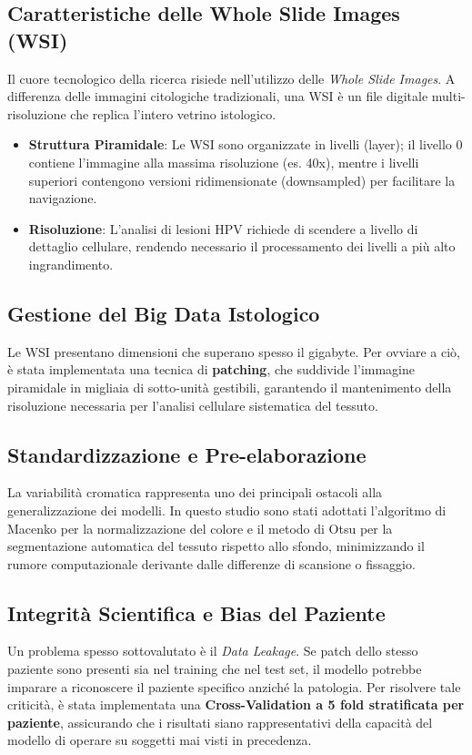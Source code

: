 \subsection{Caratteristiche delle Whole Slide Images (WSI)}
Il cuore tecnologico della ricerca risiede nell'utilizzo delle \textit{Whole Slide Images}. A differenza delle immagini citologiche tradizionali, una WSI è un file digitale multi-risoluzione che replica l'intero vetrino istologico. 
\begin{itemize}
	\item \textbf{Struttura Piramidale}: Le WSI sono organizzate in livelli (layer); il livello 0 contiene l'immagine alla massima risoluzione (es. 40x), mentre i livelli superiori contengono versioni ridimensionate (downsampled) per facilitare la navigazione.
	\item \textbf{Risoluzione}: L'analisi di lesioni HPV richiede di scendere a livello di dettaglio cellulare, rendendo necessario il processamento dei livelli a più alto ingrandimento.
\end{itemize}

\subsection{Gestione del Big Data Istologico} 
Le WSI presentano dimensioni che superano spesso il gigabyte. Per ovviare a ciò, è stata implementata una tecnica di \textbf{patching}, che suddivide l'immagine piramidale in migliaia di sotto-unità gestibili, garantendo il mantenimento della risoluzione necessaria per l'analisi cellulare sistematica del tessuto.



\subsection{Standardizzazione e Pre-elaborazione} 
La variabilità cromatica rappresenta uno dei principali ostacoli alla generalizzazione dei modelli. In questo studio sono stati adottati l'algoritmo di Macenko per la normalizzazione del colore e il metodo di Otsu per la segmentazione automatica del tessuto rispetto allo sfondo, minimizzando il rumore computazionale derivante dalle differenze di scansione o fissaggio.

\subsection{Integrità Scientifica e Bias del Paziente} 
Un problema spesso sottovalutato è il \textit{Data Leakage}. Se patch dello stesso paziente sono presenti sia nel training che nel test set, il modello potrebbe imparare a riconoscere il paziente specifico anziché la patologia. Per risolvere tale criticità, è stata implementata una \textbf{Cross-Validation a 5 fold stratificata per paziente}, assicurando che i risultati siano rappresentativi della capacità del modello di operare su soggetti mai visti in precedenza.